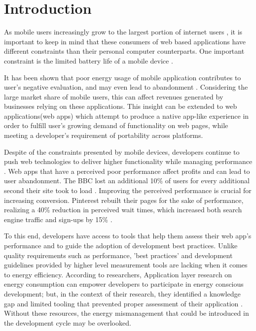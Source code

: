 \section{Introduction}

As mobile users increasingly grow to the largest portion of internet users \cite{Rep:Marketshare}, it is important to keep in mind that these consumers of web based applications have different constraints than their personal computer counterparts. One important constraint is the limited battery life of a mobile device \cite{Rep:Batt}.

It has been shown that poor energy usage of mobile application contributes to user's negative evaluation, and may even lead to abandonment \cite{WEBSITE:2}. Considering the large market share of mobile users, this can affect revenues generated by businesses relying on these applications. This insight can be extended to web applications(web apps) which attempt to produce a native app-like experience in order to fulfill user's growing demand of functionality on web pages, while meeting a developer's requirement of portability across platforms.

Despite of the constraints presented by mobile devices, developers continue to push web technologies to deliver higher functionality while managing performance \cite{Rep:State}. Web apps that have a perceived poor performance affect profits and can lead to user abandonment. The BBC lost an additional 10\% of users for every additional second their site took to load \cite{Web:bbc}. Improving the perceived performance is crucial for increasing conversion. Pinterest rebuilt their pages for the sake of performance, realizing a 40\% reduction in perceived wait times, which increased both search engine traffic and sign-ups by 15\% \cite{Web:pinterest}.

To this end, developers have access to tools that help them assess their web app's performance and to guide the adoption of development best practices. Unlike quality requirements such as performance, 'best practices' and development guidelines provided by higher level measurement tools are lacking when it comes to energy efficiency. According to researchers, Application layer research on energy consumption can empower developers to participate in energy conscious development; but, in the context of their research, they identified a knowledge gap and limited tooling that prevented proper assessment of their application \cite{Rep:EnEf}. Without these resources, the energy mismanagement that could be introduced in the development cycle may be overlooked.

